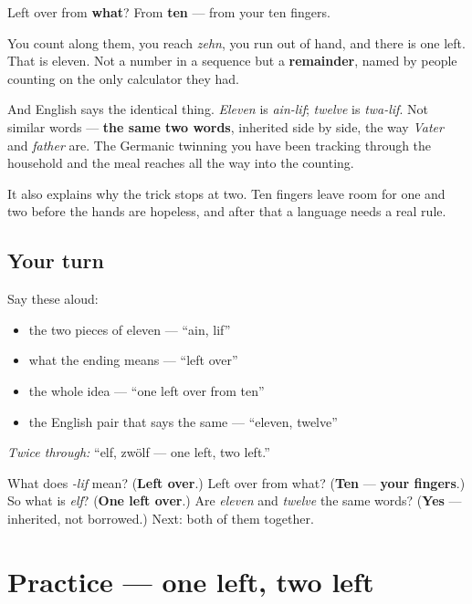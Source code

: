 \begin{culture}
Left over from \textbf{what}? From \textbf{ten} — from your ten fingers.

You count along them, you reach \emph{zehn}, you run out of hand, and there is one left. That is eleven. Not a number in a sequence but a \textbf{remainder}, named by people counting on the only calculator they had.

And English says the identical thing. \emph{Eleven} is \emph{ain-lif}; \emph{twelve} is \emph{twa-lif}. Not similar words — \textbf{the same two words}, inherited side by side, the way \emph{Vater} and \emph{father} are. The Germanic twinning you have been tracking through the household and the meal reaches all the way into the counting.

It also explains why the trick stops at two. Ten fingers leave room for one and two before the hands are hopeless, and after that a language needs a real rule.
\end{culture}

\subsection*{Your turn}
Say these aloud:

\begin{itemize}
\raggedright
  \item the two pieces of eleven — \textquotedblleft{}ain, lif\textquotedblright{}
  \item what the ending means — \textquotedblleft{}left over\textquotedblright{}
  \item the whole idea — \textquotedblleft{}one left over from ten\textquotedblright{}
  \item the English pair that says the same — \textquotedblleft{}eleven, twelve\textquotedblright{}
\end{itemize}

\emph{Twice through:} \textquotedblleft{}elf, zwölf — one left, two left.\textquotedblright{}

\begin{tcolorbox}[breakable,colback=teal!4,colframe=teal!35!black,title={Before you move on}]
What does \emph{-lif} mean? (\textbf{Left over}.) Left over from what? (\textbf{Ten} — \textbf{your fingers}.) So what is \emph{elf}? (\textbf{One left over}.) Are \emph{eleven} and \emph{twelve} the same words? (\textbf{Yes} — inherited, not borrowed.) Next: both of them together.
\end{tcolorbox}
\section[Practice]{Practice — one left, two left}

